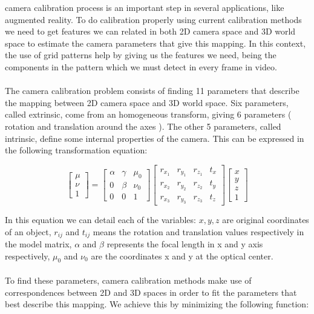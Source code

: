 \documentclass[journal]{IEEEtran}
\begin{document}
 camera calibration process is an important step in several applications, like augmented reality. To do calibration properly using current calibration methods we need to get features we can related in both 2D camera space and 3D world space to estimate the camera parameters that give this mapping. In this context, the use of grid patterns help by giving us the features we need, being the components in the pattern which we must detect in every frame in video.
\\
\\
The camera calibration problem consists of finding 11 parameters that describe the mapping between 2D camera space and 3D world space. Six parameters, called extrinsic, come from an homogeneous transform, giving 6 parameters ( rotation and translation around the axes ). The other 5 parameters, called intrinsic, define some internal properties of the camera. This can be expressed in the following transformation equation:

\begin{equation}
  \begin{bmatrix}
    \mu \\
    \nu \\
      1
  \end{bmatrix} =
  \begin{bmatrix}
    \alpha & \gamma & \mu_{0} \\
       0   & \beta  & \nu_{0} \\
       0   &    0   &    1
  \end{bmatrix}
  \begin{bmatrix}
    r_{x_{1}} & r_{y_{1}} & r_{z_{1}} & t_{x}\\
    r_{x_{2}} & r_{y_{2}} & r_{z_{2}} & t_{y}\\
    r_{x_{3}} & r_{y_{3}} & r_{z_{3}} & t_{z}
  \end{bmatrix}
  \begin{bmatrix}
    x \\
    y \\
    z \\
    1
  \end{bmatrix}
%
\end{equation}

In this equation we can detail each of the variables: $x,y,z$ are original coordinates of an object, $r_{ij}$ and $t_{ij}$ means the rotation and translation values respectively in the model matrix, $\alpha$ and $\beta$ represents the focal length in x and y axis respectively, $\mu_0$ and $\nu_0$ are the coordinates x and y at the optical center.
\\
\\
To find these parameters, camera calibration methods make use of correspondences between 2D and 3D spaces in order to fit the parameters that best describe this mapping. We achieve this by minimizing the following function:
\end{document}
